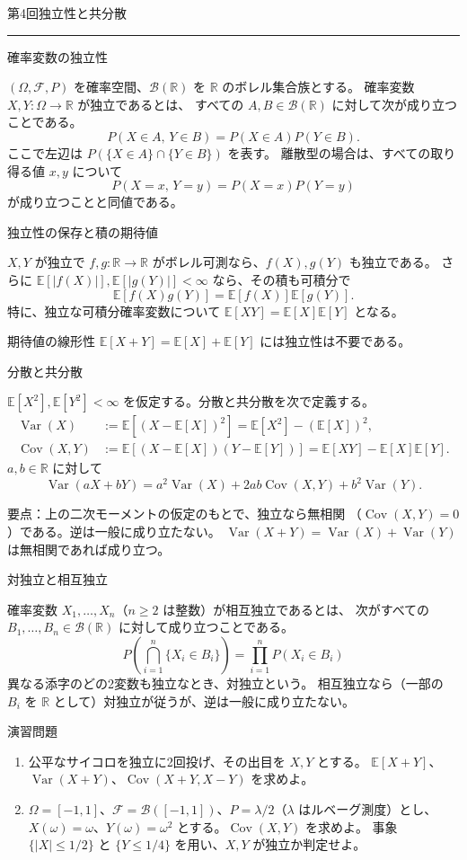 \documentclass[a4paper,10pt,pdflatex,ja=standard,jafont=ipaex-type1,
  magstyle=real,scale=1]{bxjsarticle}
\newcommand{\lecturenumber}{4}
\newcommand{\topic}[1]{\par\vspace{5pt}
  {\large\sffamily\mdseries\color{accent}#1}\par\vspace{2pt}}
\newcommand{\handouttitle}[1]{%
  \pdfbookmark[0]{#1}{lecture\lecturenumber}%
  \begin{center}
    {\Large\color{ink}#1}\par\vspace{3mm}
    {\color{accent}\rule{0.88\linewidth}{0.7pt}}
  \end{center}\vspace{-2mm}}
\newcommand{\keybox}[1]{\par\vspace{3pt}\begingroup
  \setlength{\fboxsep}{5pt}
  \colorbox{soft}{\parbox{\dimexpr\linewidth-2\fboxsep\relax}{#1}}%
  \endgroup\par\vspace{2pt}}
\newcommand{\examplelabel}[1]{{\sffamily\mdseries\color{ink}#1}}
\newcommand{\F}{\mathcal F}
\newcommand{\R}{\mathbb R}
\newcommand{\E}{\mathbb E}
\newcommand{\Var}{\operatorname{Var}}
\newcommand{\Cov}{\operatorname{Cov}}
\begin{document}
\fontsize{10pt}{13.5pt}\selectfont
\handouttitle{第4回\quad 独立性と共分散}

\topic{確率変数の独立性}
$(\Omega,\F,P)$ を確率空間、$\mathcal B(\R)$ を $\R$ のボレル集合族とする。
確率変数 $X,Y:\Omega\to\R$ が独立であるとは、
すべての $A,B\in\mathcal B(\R)$ に対して次が成り立つことである。
$$
  P(X\in A,\,Y\in B)=P(X\in A)P(Y\in B).
$$
ここで左辺は $P(\{X\in A\}\cap\{Y\in B\})$ を表す。
離散型の場合は、すべての取り得る値 $x,y$ について
$$
  P(X=x,\,Y=y)=P(X=x)P(Y=y)
$$
が成り立つことと同値である。

\topic{独立性の保存と積の期待値}
$X,Y$ が独立で $f,g:\R\to\R$ がボレル可測なら、$f(X),g(Y)$ も独立である。
さらに $\E[|f(X)|],\E[|g(Y)|]<\infty$ なら、その積も可積分で
$$
  \E[f(X)g(Y)]=\E[f(X)]\E[g(Y)].
$$
特に、独立な可積分確率変数について $\E[XY]=\E[X]\E[Y]$ となる。

期待値の線形性 $\E[X+Y]=\E[X]+\E[Y]$ には独立性は不要である。

\topic{分散と共分散}
$\E[X^2],\E[Y^2]<\infty$ を仮定する。分散と共分散を次で定義する。
$$
  \begin{aligned}
    \Var(X)&:=\E[(X-\E[X])^2]=\E[X^2]-(\E[X])^2,\\
    \Cov(X,Y)&:=\E[(X-\E[X])(Y-\E[Y])]=\E[XY]-\E[X]\E[Y].
  \end{aligned}
$$
$a,b\in\R$ に対して
$$
  \Var(aX+bY)=a^2\Var(X)+2ab\Cov(X,Y)+b^2\Var(Y).
$$
\keybox{\examplelabel{要点：}上の二次モーメントの仮定のもとで、独立なら無相関
（$\Cov(X,Y)=0$）である。逆は一般に成り立たない。
$\Var(X+Y)=\Var(X)+\Var(Y)$ は無相関であれば成り立つ。}

\topic{対独立と相互独立}
確率変数 $X_1,\ldots,X_n$（$n\ge2$ は整数）が相互独立であるとは、
次がすべての $B_1,\ldots,B_n\in\mathcal B(\R)$ に対して成り立つことである。
$$
  P\left(\bigcap_{i=1}^n\{X_i\in B_i\}\right)
  =\prod_{i=1}^nP(X_i\in B_i)
$$
異なる添字のどの2変数も独立なとき、対独立という。
相互独立なら（一部の $B_i$ を $\R$ として）対独立が従うが、逆は一般に成り立たない。

\topic{演習問題}
\begin{enumerate}[label=\arabic*.]
  \item 公平なサイコロを独立に2回投げ、その出目を $X,Y$ とする。
  $\E[X+Y]$、$\Var(X+Y)$、$\Cov(X+Y,X-Y)$ を求めよ。
  \item $\Omega=[-1,1]$、$\F=\mathcal B([-1,1])$、$P=\lambda/2$（$\lambda$ はルベーグ測度）とし、
  $X(\omega)=\omega$、$Y(\omega)=\omega^2$ とする。$\Cov(X,Y)$ を求めよ。
  事象 $\{|X|\le1/2\}$ と $\{Y\le1/4\}$ を用い、$X,Y$ が独立か判定せよ。
\end{enumerate}
\end{document}
